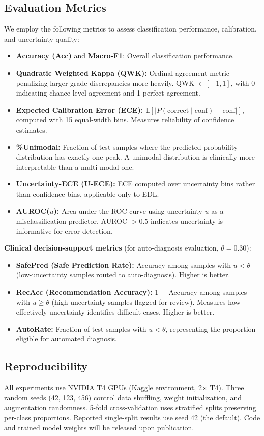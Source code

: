 \subsection{Evaluation Metrics}

We employ the following metrics to assess classification performance, calibration, and uncertainty quality:

\begin{itemize}
    \item \textbf{Accuracy (Acc)} and \textbf{Macro-F1}: Overall classification performance.
    \item \textbf{Quadratic Weighted Kappa (QWK):} Ordinal agreement metric penalizing larger grade discrepancies more heavily. QWK $\in [-1, 1]$, with 0 indicating chance-level agreement and 1 perfect agreement.
    \item \textbf{Expected Calibration Error (ECE):} $\mathbb{E}[|P(\text{correct} \mid \text{conf}) - \text{conf}|]$, computed with 15 equal-width bins. Measures reliability of confidence estimates.
    \item \textbf{\%Unimodal:} Fraction of test samples where the predicted probability distribution has exactly one peak. A unimodal distribution is clinically more interpretable than a multi-modal one.
    \item \textbf{Uncertainty-ECE (U-ECE):} ECE computed over uncertainty bins rather than confidence bins, applicable only to EDL.
    \item \textbf{AUROC($u$):} Area under the ROC curve using uncertainty $u$ as a misclassification predictor. AUROC $>0.5$ indicates uncertainty is informative for error detection.
\end{itemize}

\textbf{Clinical decision-support metrics} (for auto-diagnosis evaluation, $\theta = 0.30$):

\begin{itemize}
    \item \textbf{SafePred (Safe Prediction Rate):} Accuracy among samples with $u < \theta$ (low-uncertainty samples routed to auto-diagnosis). Higher is better.
    \item \textbf{RecAcc (Recommendation Accuracy):} 1 $-$ Accuracy among samples with $u \geq \theta$ (high-uncertainty samples flagged for review). Measures how effectively uncertainty identifies difficult cases. Higher is better.
    \item \textbf{AutoRate:} Fraction of test samples with $u < \theta$, representing the proportion eligible for automated diagnosis.
\end{itemize}

\subsection{Reproducibility}

All experiments use NVIDIA T4 GPUs (Kaggle environment, 2$\times$ T4). Three random seeds (42, 123, 456) control data shuffling, weight initialization, and augmentation randomness. 5-fold cross-validation uses stratified splits preserving per-class proportions. Reported single-split results use seed 42 (the default). Code and trained model weights will be released upon publication.

